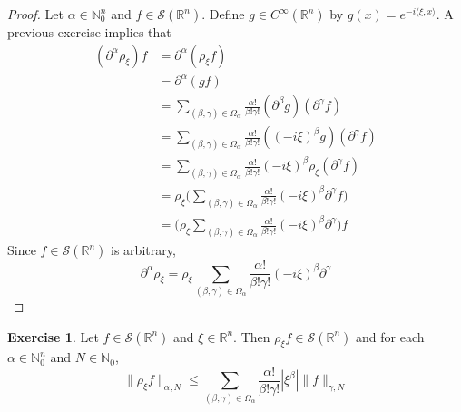 \documentclass{book}
\theoremstyle{definition}
\newtheorem{ex}[definition]{Exercise}
\newcommand{\al}{\alpha}
\newcommand{\be}{\beta}
\newcommand{\gam}{\gamma}
\newcommand{\Om}{\Omega}
\newcommand{\N}{\mathbb{N}}
\newcommand{\R}{\mathbb{R}}
\newcommand{\MS}{\mathcal{S}}
\DeclareMathOperator*{\0}{\mbf{0}}
\DeclareMathOperator*{\1}{\mbf{1}}
\renewcommand{\r}{\rangle}
\renewcommand{\l}{\langle}
\newcommand{\p}{\partial}
\begin{document}
	\begin{proof}
		Let $\al \in \N_0^n$ and $f \in \MS(\R^n)$. Define $g \in C^{\infty}(\R^n)$ by $g(x) = e^{-i \l \xi, x \r}$. A previous exercise implies that 
		\begin{align*}
			(\p^{\al} \rho_{\xi})f
			& = \p^{\al} (\rho_{\xi} f) \\
			& = \p^{\al} (gf) \\
			& = \sum_{(\be, \gam) \in \Om_{\al}} \frac{\al!}{\be! \gam!}( \p^{\be} g) (\p^{\gam} f) \\
			& = \sum_{(\be, \gam) \in \Om_{\al}} \frac{\al!}{\be! \gam!}((-i \xi)^{\be} g) (\p^{\gam} f) \\
			& = \sum_{(\be, \gam) \in \Om_{\al}} \frac{\al!}{\be! \gam!} (-i \xi)^{\be} \rho_{\xi}( \p^{\gam} f) \\
			& = \rho_{\xi} \bigg( \sum_{(\be, \gam) \in \Om_{\al}} \frac{\al!}{\be! \gam!} (-i \xi)^{\be}  \p^{\gam} f \bigg ) \\
			& = \bigg( \rho_{\xi}  \sum_{(\be, \gam) \in \Om_{\al}} \frac{\al!}{\be! \gam!} (-i \xi)^{\be}  \p^{\gam}  \bigg) f
		\end{align*}
		Since $f \in \MS(\R^n)$ is arbitrary, 
		$$\p^{\al} \rho_{\xi} = \rho_{\xi}  \sum_{(\be, \gam) \in \Om_{\al}} \frac{\al!}{\be! \gam!} (-i \xi)^{\be}  \p^{\gam} $$
	\end{proof}

	\begin{ex}
		Let $f \in \MS(\R^n)$ and $\xi \in \R^n$. Then $\rho_{\xi} f \in \MS(\R^n)$ and for each $\al \in \N_0^n$ and $N \in \N_0$, 
		$$\|\rho_{\xi}f\|_{\al, N} \leq \sum_{(\be, \gam) \in \Om_{\al}} \frac{\al!}{\be! \gam!} |\xi^{\be}|  \|f\|_{\gam, N}$$
	\end{ex}
	
\end{document}
